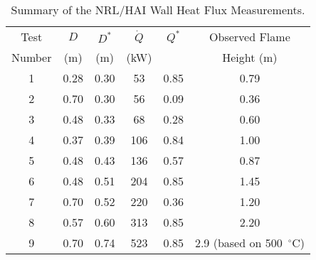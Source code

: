 \begin{table}[ht]
\caption{Summary of the NRL/HAI Wall Heat Flux Measurements. }
\begin{center}
\begin{tabular}{|c|c|c|c|c|c|}
\hline
Test     & $D$     & $D^*$      & $\dot{Q}$   & $Q^*$   & Observed  Flame \\
Number   & (m)     & (m)        & (kW)        &         & Height (m)      \\ \hline \hline
1        & 0.28    & 0.30       &  53         & 0.85    & 0.79            \\ \hline
2        & 0.70    & 0.30       &  56         & 0.09    & 0.36            \\ \hline
3        & 0.48    & 0.33       &  68         & 0.28    & 0.60            \\ \hline
4        & 0.37    & 0.39       &  106        & 0.84    & 1.00            \\ \hline
5        & 0.48    & 0.43       &  136        & 0.57    & 0.87            \\ \hline
6        & 0.48    & 0.51       &  204        & 0.85    & 1.45            \\ \hline
7        & 0.70    & 0.52       &  220        & 0.36    & 1.20            \\ \hline
8        & 0.57    & 0.60       &  313        & 0.85    & 2.20            \\ \hline
9        & 0.70    & 0.74       &  523        & 0.85    & 2.9 (based on 500~$^\circ$C)       \\ \hline
\end{tabular}
\end{center}
\label{NRL/HAI_Parameters}
\end{table}

\newpage

